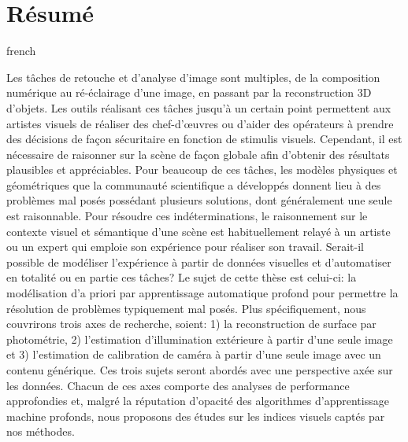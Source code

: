 \chapter*{Résumé}                      %

\begin{otherlanguage*}{french}

Les tâches de retouche et d'analyse d'image sont multiples, de la composition numérique au ré-éclairage d'une image, en passant par la reconstruction 3D d'objets. Les outils réalisant ces tâches jusqu'à un certain point permettent aux artistes visuels de réaliser des chef-d'\oe{}uvres ou d'aider des opérateurs à prendre des décisions de façon sécuritaire en fonction de stimulis visuels. Cependant, il est nécessaire de raisonner sur la scène de façon globale afin d'obtenir des résultats plausibles et appréciables. Pour beaucoup de ces tâches, les modèles physiques et géométriques que la communauté scientifique a développés donnent lieu à des problèmes mal posés possédant plusieurs solutions, dont généralement une seule est raisonnable. Pour résoudre ces indéterminations, le raisonnement sur le contexte visuel et sémantique d'une scène est habituellement relayé à un artiste ou un expert qui emploie son expérience pour réaliser son travail. Serait-il possible de modéliser l'expérience à partir de données visuelles et d'automatiser en totalité ou en partie ces tâches? Le sujet de cette thèse est celui-ci: la modélisation d'a priori par apprentissage automatique profond pour permettre la résolution de problèmes typiquement mal posés. Plus spécifiquement, nous couvrirons trois axes de recherche, soient: 1) la reconstruction de surface par photométrie, 2) l'estimation d'illumination extérieure à partir d'une seule image et 3) l'estimation de calibration de caméra à partir d'une seule image avec un contenu générique. Ces trois sujets seront abordés avec une perspective axée sur les données. Chacun de ces axes comporte des analyses de performance approfondies et, malgré la réputation d'opacité des algorithmes d'apprentissage machine profonds, nous proposons des études sur les indices visuels captés par nos méthodes. 

\end{otherlanguage*}
